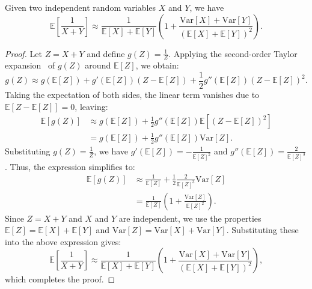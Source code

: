 \begin{proposition}
\label{Pro:2}
    Given two independent random variables $X$ and $Y$, we have 
    \begin{equation*}
        \mathbb{E}\left[ \frac{1}{X+Y} \right] \approx \frac{1}{\mathbb{E}[X] + \mathbb{E}[Y]} \left( 1 + \frac{\mathrm{Var}[X] + \mathrm{Var}[Y]}{\left( \mathbb{E}[X] + \mathbb{E}[Y] \right)^2} \right).
    \end{equation*}
\end{proposition}

\begin{proof}
    Let $Z = X + Y$ and define $g(Z) = \frac{1}{Z}$. Applying the second-order Taylor expansion~\cite{lehmann2006theory} of $g(Z)$ around $\mathbb{E}[Z]$, we obtain:
    \begin{equation*}
        g(Z) \approx g(\mathbb{E}[Z]) + g'(\mathbb{E}[Z]) \left( Z - \mathbb{E}[Z] \right) + \frac{1}{2} g''(\mathbb{E}[Z]) \left( Z - \mathbb{E}[Z] \right)^2.
    \end{equation*}
    Taking the expectation of both sides, the linear term vanishes due to $\mathbb{E}[Z - \mathbb{E}[Z]] = 0$, leaving:
    \begin{equation*}
        \begin{aligned}
            \mathbb{E}[g(Z)] & \approx g(\mathbb{E}[Z]) + \frac{1}{2} g''(\mathbb{E}[Z]) \mathbb{E}\left[ \left( Z - \mathbb{E}[Z] \right)^2 \right] \\
            & = g(\mathbb{E}[Z]) + \frac{1}{2} g''(\mathbb{E}[Z]) \mathrm{Var}[Z].
        \end{aligned}
    \end{equation*}
    Substituting $g(Z) = \frac{1}{Z}$, we have $g'(\mathbb{E}[Z]) = -\frac{1}{\mathbb{E}[Z]^2}$ and $g''(\mathbb{E}[Z]) = \frac{2}{\mathbb{E}[Z]^3}$. Thus, the expression simplifies to:
    \begin{equation*}
        \begin{aligned}
            \mathbb{E}[g(Z)] & \approx \frac{1}{\mathbb{E}[Z]} + \frac{1}{2} \frac{2}{\mathbb{E}[Z]^3} \mathrm{Var}[Z] \\
            & = \frac{1}{\mathbb{E}[Z]} \left( 1 + \frac{\mathrm{Var}[Z]}{\mathbb{E}[Z]^2} \right).
        \end{aligned}
    \end{equation*}
    Since $Z = X + Y$ and $X$ and $Y$ are independent, we use the properties $\mathbb{E}[Z] = \mathbb{E}[X] + \mathbb{E}[Y]$ and $\mathrm{Var}[Z] = \mathrm{Var}[X] + \mathrm{Var}[Y]$. Substituting these into the above expression gives:
    \begin{equation*}
        \mathbb{E}\left[ \frac{1}{X+Y} \right] \approx \frac{1}{\mathbb{E}[X] + \mathbb{E}[Y]} \left( 1 + \frac{\mathrm{Var}[X] + \mathrm{Var}[Y]}{\left( \mathbb{E}[X] + \mathbb{E}[Y] \right)^2} \right),
    \end{equation*}
    which completes the proof.
\end{proof}

